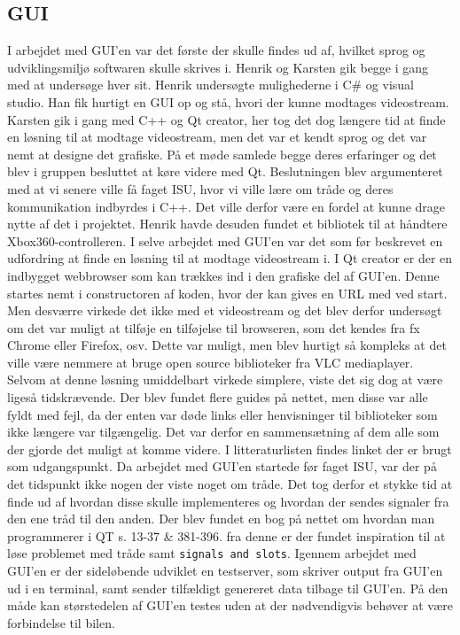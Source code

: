 \subsection{GUI}

I arbejdet med GUI’en var det første der skulle findes ud af, hvilket sprog og udviklingsmiljø softwaren skulle skrives i. Henrik og Karsten gik begge i gang med at undersøge hver sit. Henrik undersøgte mulighederne i C\# og visual studio. Han fik hurtigt en GUI op og stå, hvori der kunne modtages videostream. Karsten gik i gang med C++ og Qt creator, her tog det dog længere tid at finde en løsning til at modtage videostream, men det var et kendt sprog og det var nemt at designe det grafiske. På et møde samlede begge deres erfaringer og det blev i gruppen besluttet at køre videre med Qt. Beslutningen blev argumenteret med at vi senere ville få faget ISU, hvor vi ville lære om tråde og deres kommunikation indbyrdes i C++. Det ville derfor være en fordel at kunne drage nytte af det i projektet. Henrik havde desuden fundet et bibliotek til at håndtere Xbox360-controlleren.
I selve arbejdet med GUI’en var det som før beskrevet en udfordring at finde en løsning til at modtage videostream i. I Qt creator er der en indbygget webbrowser som kan trækkes ind i den grafiske del af GUI’en. Denne startes nemt i constructoren af koden, hvor der kan gives en URL med ved start. Men desværre virkede det ikke med et videostream og det blev derfor undersøgt om det var muligt at tilføje en tilføjelse til browseren, som det kendes fra fx Chrome eller Firefox, osv. Dette var muligt, men blev hurtigt så kompleks at det ville være nemmere at bruge open source biblioteker fra VLC mediaplayer. Selvom at denne løsning umiddelbart virkede simplere, viste det sig dog at være ligeså tidskrævende. Der blev fundet flere guides på nettet, men disse var alle fyldt med fejl, da der enten var døde links eller henvisninger til biblioteker som ikke længere var tilgængelig. Det var derfor en sammensætning af dem alle som der gjorde det muligt at komme videre. I litteraturlisten findes linket \cite{lib:vlc-using-qt} der er brugt som udgangspunkt. 
Da arbejdet med GUI’en startede før faget ISU, var der på det tidspunkt ikke nogen der viste noget om tråde. Det tog derfor et stykke tid at finde ud af hvordan disse skulle implementeres og hvordan der sendes signaler fra den ene tråd til den anden. Der blev fundet en bog på nettet om hvordan man programmerer i QT \cite{lib:qt-bog} s. 13-37 \& 381-396. fra denne er der fundet inspiration til at løse problemet med tråde samt \texttt{signals and slots}. Igennem arbejdet med GUI'en er der sideløbende udviklet en testserver, som skriver output fra GUI'en ud i en terminal, samt sender tilfældigt genereret data tilbage til GUI'en. På den måde kan størstedelen af GUI'en testes uden at der nødvendigvis behøver at være forbindelse til bilen. 
